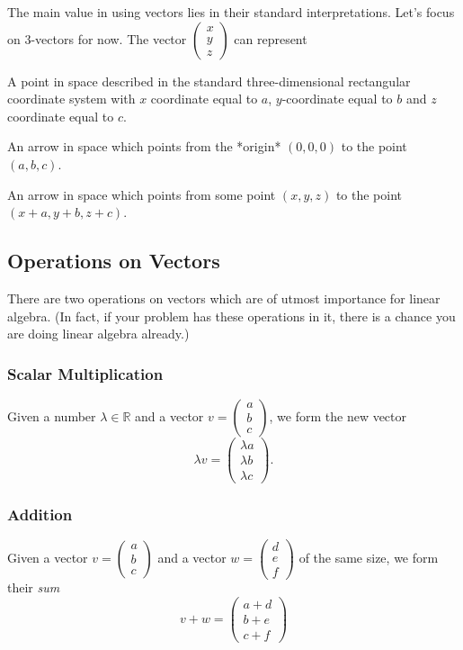 \documentclass[11pt]{amsart}
\theoremstyle{definition}
\begin{document}
The main value in using vectors lies in their standard interpretations. Let's focus on $3$-vectors for now.
The vector $\left(\begin{smallmatrix} x \\ y \\ z\end{smallmatrix}\right)$ can represent
\begin{compactitem}
\item A point in space described in the standard three-dimensional rectangular coordinate system with $x$ coordinate equal to $a$, $y$-coordinate equal to $b$ and $z$ coordinate equal to $c$.
\item An arrow in space which points from the *origin* $(0,0,0)$ to the point $(a,b,c)$.
\item An arrow in space which points from some point $(x,y,z)$ to the point $(x+a, y+b, z+c)$.
\end{compactitem}

\subsection{Operations on Vectors}

There are two operations on vectors which are of utmost importance for linear algebra.
(In fact, if your problem has these operations in it, there is a chance you are doing linear algebra already.)

\subsubsection{Scalar Multiplication}

    Given a number $\lambda \in \mathbb{R}$ and a vector $v = \left(\begin{smallmatrix} a \\ b \\ c \end{smallmatrix}\right)$, we form the new vector
    \[ \lambda v = \left(\begin{smallmatrix} \lambda a \\ \lambda b \\ \lambda c \end{smallmatrix}\right).\]

\subsubsection{Addition}

    Given a vector $v = \left(\begin{smallmatrix} a \\ b \\ c \end{smallmatrix}\right)$ and a vector $w = \left(\begin{smallmatrix} d \\ e \\ f \end{smallmatrix}\right)$ of the same size, we form their \emph{sum}
    \[ v+w = \left(\begin{smallmatrix} a+d \\ b+e \\ c+f \end{smallmatrix}\right) \]
\end{document}
